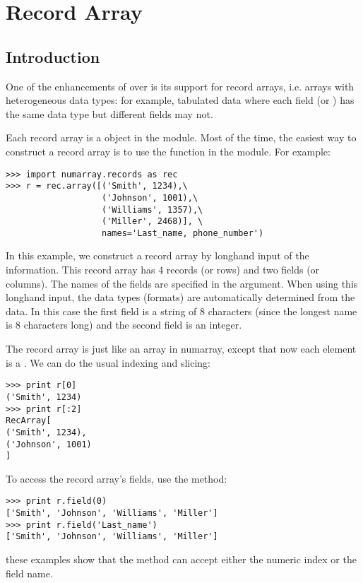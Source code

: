 \chapter{Record Array}
\label{cha:record-array}

\section{Introduction}
\label{sec:recarray-intro}
One of the enhancements of  over  is its 
support for record arrays, i.e. arrays with heterogeneous data types: 
for example, tabulated data where each field (or ) has the 
same data type but different fields may not.

Each record array is a   object in the 
 module.  Most of 
the time, the easiest way to construct a record array is to use the 
 function in the  module.  For example:
\begin{verbatim}
>>> import numarray.records as rec
>>> r = rec.array([('Smith', 1234),\
                   ('Johnson', 1001),\
                   ('Williams', 1357),\
                   ('Miller', 2468)], \
                   names='Last_name, phone_number')
\end{verbatim}
In this example, we \var{manually} construct a record array by longhand input of
the information.  This record array has 4 records (or rows) and two fields (or 
columns).  The names of the fields are specified in the  argument.  
When using this longhand input, the data types (formats) are 
automatically determined from the data.  In this case the first field is a 
string of 8 characters (since the longest name is 8 characters long) and 
the second field is an integer.

The record array is just like an array in numarray, except that now each 
element is a \code{Record}.  We can do the usual indexing and slicing:
\begin{verbatim}
>>> print r[0]
('Smith', 1234)
>>> print r[:2]
RecArray[ 
('Smith', 1234),
('Johnson', 1001)
]
\end{verbatim}
To access the record array's fields, use the  method:
\begin{verbatim}
>>> print r.field(0)
['Smith', 'Johnson', 'Williams', 'Miller']
>>> print r.field('Last_name')
['Smith', 'Johnson', 'Williams', 'Miller']
\end{verbatim}
these examples show that the \code{field} method can accept either the 
numeric index or the field name.

